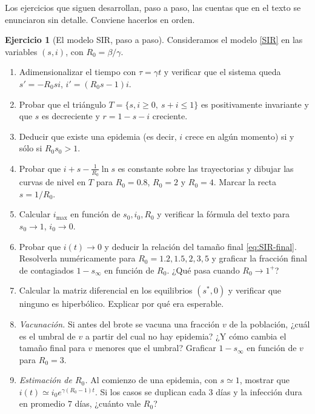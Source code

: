 \documentclass[12pt, a4paper]{amsbook}
\theoremstyle{remark}
\theoremstyle{definition}
\newtheorem{ejer}[teo]{Ejercicio}
\numberwithin{section}{chapter}
\numberwithin{subsection}{section}
\numberwithin{equation}{section}
\numberwithin{figure}{chapter}
\begin{document}
Los ejercicios que siguen desarrollan, paso a paso, las cuentas que en el texto se enunciaron sin detalle. Conviene hacerlos en orden.

\begin{ejer}[El modelo SIR, paso a paso]\label{ejer:SIR-guiado}
Consideramos el modelo \eqref{SIR} en las variables $(s,i)$, con $R_0=\beta/\gamma$.
\begin{enumerate}
\item Adimensionalizar el tiempo con $\tau=\gamma t$ y verificar que el sistema queda $s'=-R_0 si$, $i'=(R_0s-1)i$.
\item Probar que el triángulo $T=\{s,i\ge 0,\ s+i\le 1\}$ es positivamente invariante y que $s$ es decreciente y $r=1-s-i$ creciente.
\item Deducir que existe una epidemia (es decir, $i$ crece en algún momento) si y sólo si $R_0 s_0>1$.
\item Probar que $i+s-\frac{1}{R_0}\ln s$ es constante sobre las trayectorias y dibujar las curvas de nivel en $T$ para $R_0=0.8$, $R_0=2$ y $R_0=4$. Marcar la recta $s=1/R_0$.
\item Calcular $i_{\max}$ en función de $s_0,i_0,R_0$ y verificar la fórmula del texto para $s_0\to 1$, $i_0\to 0$.
\item Probar que $i(t)\to 0$ y deducir la relación del tamaño final \eqref{eq:SIR-final}. Resolverla numéricamente para $R_0 = 1.2, 1.5, 2, 3, 5$ y graficar la fracción final de contagiados $1-s_\infty$ en función de $R_0$. ¿Qué pasa cuando $R_0\to 1^+$?
\item Calcular la matriz diferencial en los equilibrios $(s^*,0)$ y verificar que ninguno es hiperbólico. Explicar por qué era esperable.
\item \emph{Vacunación.} Si antes del brote se vacuna una fracción $v$ de la población, ¿cuál es el umbral de $v$ a partir del cual no hay epidemia? ¿Y cómo cambia el tamaño final para $v$ menores que el umbral? Graficar $1-s_\infty$ en función de $v$ para $R_0=3$.
\item \emph{Estimación de $R_0$.} Al comienzo de una epidemia, con $s\simeq 1$, mostrar que $i(t)\simeq i_0 e^{\gamma(R_0-1)t}$. Si los casos se duplican cada $3$ días y la infección dura en promedio $7$ días, ¿cuánto vale $R_0$?
\end{enumerate}
\end{ejer}
\end{document}
